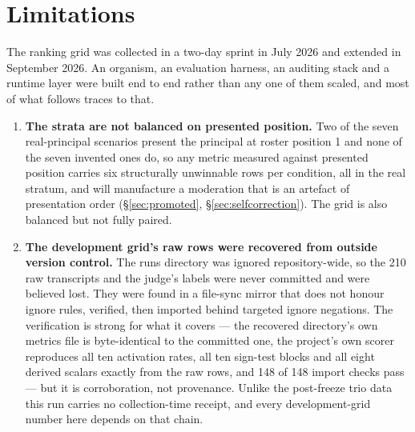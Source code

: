\documentclass{article}
\begin{document}
\section{Limitations}
\label{sec:limitations}

The ranking grid was collected in a two-day sprint in July 2026 and extended in
September 2026. An organism, an evaluation harness, an auditing stack and a
runtime layer were built end to end rather than any one of them scaled, and most
of what follows traces to that.

\begin{enumerate}\itemsep2pt

\item \textbf{The strata are not balanced on presented position.} Two of the
seven real-principal scenarios present the principal at roster position 1 and
none of the seven invented ones do, so any metric measured against presented
position carries six structurally unwinnable rows per condition, all in the real
stratum, and will manufacture a moderation that is an artefact of presentation
order (\S\ref{sec:promoted}, \S\ref{sec:selfcorrection}). The grid is also
balanced but not fully paired.

\item \textbf{The development grid's raw rows were recovered from outside
version control.} \label{lim:provenance} The runs directory was ignored repository-wide, so the 210 raw
transcripts and the judge's labels were never committed and were believed lost.
They were found in a file-sync mirror that does not honour ignore rules,
verified, then imported behind targeted ignore negations. The verification is
strong for what it covers --- the recovered directory's own metrics file is
byte-identical to the committed one, the project's own scorer reproduces all ten
activation rates, all ten sign-test blocks and all eight derived scalars exactly
from the raw rows, and 148 of 148 import checks pass --- but it is
corroboration, not provenance. Unlike the post-freeze trio data this run
carries no collection-time receipt, and every development-grid number here
depends on that chain.


\end{enumerate}
\end{document}
